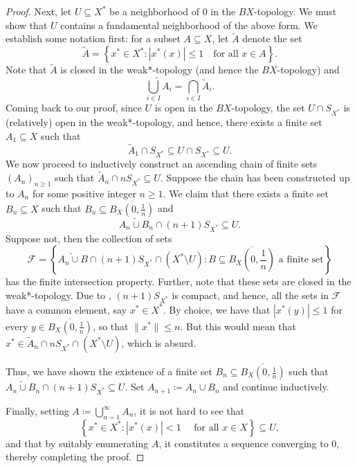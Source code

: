 \documentclass[11pt]{article}
\theoremstyle{thmstyle}
\theoremstyle{defstyle}
\newcommand{\scrF}{\mathscr F}
\newcommand{\wt}[1]{\widetilde{#1}}
\renewcommand{\le}{\leqslant}
\renewcommand{\ge}{\geqslant}
\begin{document}
\begin{proof}
    Next, let $U\subseteq X^\ast$ be a neighborhood of $0$ in the $BX$-topology. We must show that $U$ contains a fundamental neighborhood of the above form. We establish some notation first: for a subset $A\subseteq X$, let $\wt A$ denote the set 
    \begin{equation*}
        \wt A = \left\{x^\ast\in X^\ast\colon |x^\ast(x)|\le 1\quad\text{for all }x\in A\right\}.
    \end{equation*}
    Note that $\wt A$ is closed in the weak*-topology (and hence the $BX$-topology) and 
    \begin{equation*}
        \wt{\bigcup_{i\in I}A_i} = \bigcap_{i\in I}\wt A_i.
    \end{equation*}
    Coming back to our proof, since $U$ is open in the $BX$-topology, the set $U\cap S_{X^\ast}$ is (relatively) open in the weak*-topology, and hence, there exists a finite set $A_1\subseteq X$ such that 
    \begin{equation*}
        \wt A_1\cap S_{X^\ast}\subseteq U\cap S_{X^\ast}\subseteq U.
    \end{equation*}
    We now proceed to inductively construct an ascending chain of finite sets $(A_n)_{n\ge 1}$ such that $\wt A_n\cap nS_{X^\ast}\subseteq U$. Suppose the chain has been constructed up to $A_n$ for some positive integer $n\ge 1$. We claim that there exists a finite set $B_n\subseteq X$ such that $B_n\subseteq\overline{B_X\left(0, \frac{1}{n}\right)}$ and 
    \begin{equation*}
        \wt{A_n\cup B_n}\cap(n + 1) S_{X^\ast}\subseteq U.
    \end{equation*}
    Suppose not, then the collection of sets 
    \begin{equation*}
        \scrF = \left\{\wt{A_n\cup B}\cap (n + 1)S_{X^\ast}\cap\left(X^\ast\setminus U\right)\colon B\subseteq\overline{B_X\left(0, \frac{1}{n}\right)}\text{ a finite set}\right\}
    \end{equation*}
    has the finite intersection property. Further, note that these sets are closed in the weak*-topology. Due to , $(n + 1)S_{X^\ast}$ is compact, and hence, all the sets in $\scrF$ have a common element, say $x^\ast\in X^\ast$. By choice, we have that $|x^\ast(y)|\le 1$ for every $y\in\overline{B_X\left(0, \frac{1}{n}\right)}$, so that $\|x^\ast\|\le n$. But this would mean that $x^\ast\in\wt A_n\cap nS_{X^\ast}\cap\left(X^\ast\setminus U\right)$, which is absurd.

    Thus, we have shown the existence of a finite set $B_n\subseteq\overline{B_X\left(0, \frac{1}{n}\right)}$ such that $\wt{A_n\cup B_n}\cap(n + 1)S_{X^\ast}\subseteq U$. Set $A_{n + 1}\coloneq A_n\cup B_n$ and continue inductively.

    Finally, setting $\displaystyle A\coloneq\bigcup_{n = 1}^\infty A_n$, it is not hard to see that 
    \begin{equation*}
        \left\{x^\ast\in X^\ast\colon |x^\ast(x)| < 1\quad\text{ for all }x\in X\right\}\subseteq U,
    \end{equation*}
    and that by suitably enumerating $A$, it constitutes a sequence converging to $0$, thereby completing the proof.
\end{proof}
\end{document}
